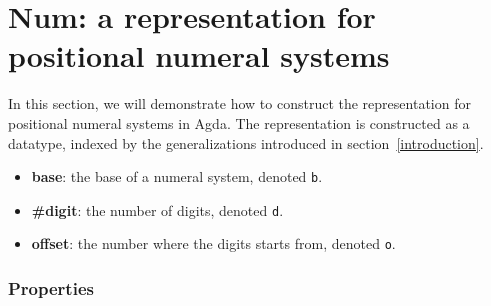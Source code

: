 \documentclass[../thesis.tex]{subfiles}
\begin{document}







%


\section{Num: a representation for positional numeral systems}\label{representation}

In this section, we will demonstrate how to construct the representation for positional
numeral systems in Agda. The representation is constructed as a datatype, indexed
by the generalizations introduced in section~\ref{introduction}.

\begin{itemize}
    \item \textbf{base}: the base of a numeral system, denoted {\lstinline|b|}.
    \item \textbf{\#digit}: the number of digits, denoted {\lstinline|d|}.
    \item \textbf{offset}: the number where the digits starts from, denoted {\lstinline|o|}.
\end{itemize}



\subsubsection{Properties}
\end{document}
